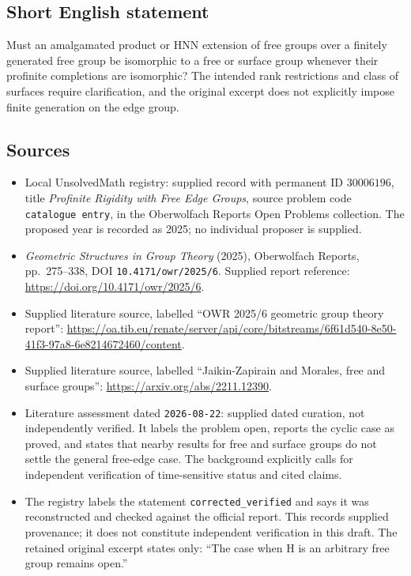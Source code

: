 \documentclass[11pt]{article}
\begin{document}
\subsection{Short English statement}
Must an amalgamated product or HNN extension of free groups over a finitely generated free group be isomorphic to a free or surface group whenever their profinite completions are isomorphic? The intended rank restrictions and class of surfaces require clarification, and the original excerpt does not explicitly impose finite generation on the edge group.
\subsection{Sources}
\begin{itemize}
\item Local UnsolvedMath registry: supplied record with permanent ID \(30006196\), title \emph{Profinite Rigidity with Free Edge Groups}, source problem code \texttt{catalogue entry}, in the Oberwolfach Reports Open Problems collection. The proposed year is recorded as 2025; no individual proposer is supplied.
\item \emph{Geometric Structures in Group Theory} (2025), Oberwolfach Reports, pp.~275--338, DOI \texttt{10.4171/owr/2025/6}. Supplied report reference: \url{https://doi.org/10.4171/owr/2025/6}.
\item Supplied literature source, labelled ``OWR 2025/6 geometric group theory report'': \url{https://oa.tib.eu/renate/server/api/core/bitstreams/6f61d540-8e50-41f3-97a8-6e8214672460/content}.
\item Supplied literature source, labelled ``Jaikin-Zapirain and Morales, free and surface groups'': \url{https://arxiv.org/abs/2211.12390}.
\item Literature assessment dated \texttt{2026-08-22}: supplied dated curation, not independently verified. It labels the problem open, reports the cyclic case as proved, and states that nearby results for free and surface groups do not settle the general free-edge case. The background explicitly calls for independent verification of time-sensitive status and cited claims.
\item The registry labels the statement \texttt{corrected\_verified} and says it was reconstructed and checked against the official report. This records supplied provenance; it does not constitute independent verification in this draft. The retained original excerpt states only: ``The case when H is an arbitrary free group remains open.''
\end{itemize}
\end{document}

